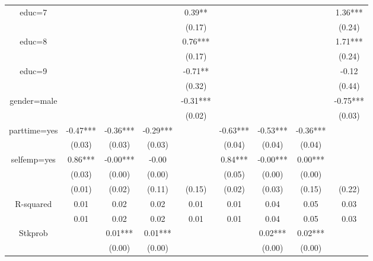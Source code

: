 \begin{table}[ht]
\begin{adjustbox}{width={0.9\textwidth},totalheight={\textheight}}
\begin{threeparttable}
\begin{tabular}{ccccccccc}
educ=7       &           &           &            &      0.39** &           &            &             &      1.36*** \\
             &           &           &            &      (0.17) &           &            &             &       (0.24) \\
educ=8       &           &           &            &     0.76*** &           &            &             &      1.71*** \\
             &           &           &            &      (0.17) &           &            &             &       (0.24) \\
educ=9       &           &           &            &     -0.71** &           &            &             &        -0.12 \\
             &           &           &            &      (0.32) &           &            &             &       (0.44) \\
gender=male  &           &           &            &    -0.31*** &           &            &             &     -0.75*** \\
             &           &           &            &      (0.02) &           &            &             &       (0.03) \\
parttime=yes &  -0.47*** &  -0.36*** &   -0.29*** &             &  -0.63*** &   -0.53*** &    -0.36*** &              \\
             &    (0.03) &    (0.03) &     (0.03) &             &    (0.04) &     (0.04) &      (0.04) &              \\
selfemp=yes  &   0.86*** &  -0.00*** &      -0.00 &             &   0.84*** &   -0.00*** &     0.00*** &              \\
             &    (0.03) &    (0.00) &     (0.00) &             &    (0.05) &     (0.00) &      (0.00) &              \\
             &    (0.01) &    (0.02) &     (0.11) &      (0.15) &    (0.02) &     (0.03) &      (0.15) &       (0.22) \\
R-squared    &      0.01 &      0.02 &       0.02 &        0.01 &      0.01 &       0.04 &        0.05 &         0.03 \\
             &      0.01 &      0.02 &       0.02 &        0.01 &      0.01 &       0.04 &        0.05 &         0.03 \\
Stkprob      &           &   0.01*** &    0.01*** &             &           &    0.02*** &     0.02*** &              \\
             &           &    (0.00) &     (0.00) &             &           &     (0.00) &      (0.00) &              \\

\end{tabular}
\end{threeparttable}
\end{adjustbox}
\end{table}
